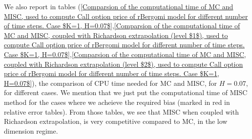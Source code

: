 \documentclass[11pt]{article}
\begin{document}
We also report in tables (\ref{Comparsion of the computational time of  MC and MISC, used to compute Call option price of rBergomi model for different number of time steps. Case $K=1, H=0.07$},\ref{Comparsion of the computational time of  MC and MISC, coupled with Richardson extrapolation (level $1$), used to compute Call option price of rBergomi model for different number of time steps. Case $K=1, H=0.07$},\ref{Comparsion of the computational time of  MC and MISC, coupled with Richardson extrapolation (level $2$), used to compute Call option price of rBergomi model for different number of time steps. Case $K=1, H=0.07$}),  the comparison of CPU time needed for MC and MISC, for $H=0.07$, for different cases. We mention that we just put the computational time of MISC method for the cases where we acheieve the required bias (marked in red in relative error tables).  From those tables, we see that MISC when coupled with Richardson extrapolation, is very competitive compared to MC, in the low dimension regime.




\end{document}
